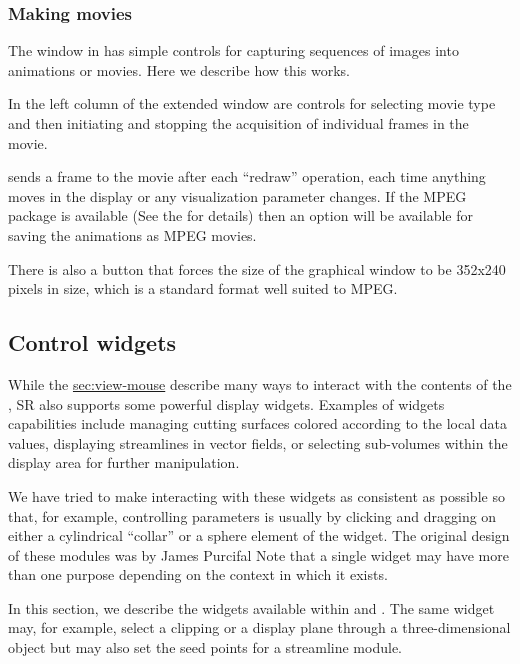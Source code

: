 \subsubsection{Making movies}
\label{sec:view-movies} 

The \viewer{} window in \SR{} has simple controls for capturing sequences
of images into animations or movies.  Here we describe how this works.

In the left column of the extended \viewer{} window are controls for
selecting movie type and then initiating and stopping the acquisition of
individual frames in the movie.

\SR{} sends a frame to the movie after each ``redraw'' operation, \ie{}
each time anything moves in the display or any visualization parameter
changes.  If the MPEG package is available (See the
 for
details) then an option will be available for saving the animations as MPEG
movies.

There is also a button that forces the size of the graphical window to be
352x240 pixels in size, which is a standard format well suited to MPEG.

\subsection{Control widgets}
\label{sec:view-widgets} 

While the \hyperref{mouse controls}{mouse controls in
Section}{}{sec:view-mouse} describe many ways to interact with the contents
of the \viewer{}, SR{} also supports some powerful display widgets.
Examples of widgets capabilities include managing cutting surfaces colored
according to the local data values, displaying streamlines in vector
fields, or selecting sub-volumes within the display area for further
manipulation. 
 
We have tried to make interacting with these widgets as consistent as
possible so that, for example, controlling parameters is usually by clicking
and dragging on either a cylindrical ``collar'' or a sphere element of the
widget.  The original design of these modules was by James Purcifal
Note that a single widget may have more than one purpose
depending on the context in which it exists.

In this section, we describe the widgets available within \SR{} and \PSE{}.
The same widget may, for example, select a clipping or a display plane
through a three-dimensional object but may also set the seed points for a
streamline module.  

